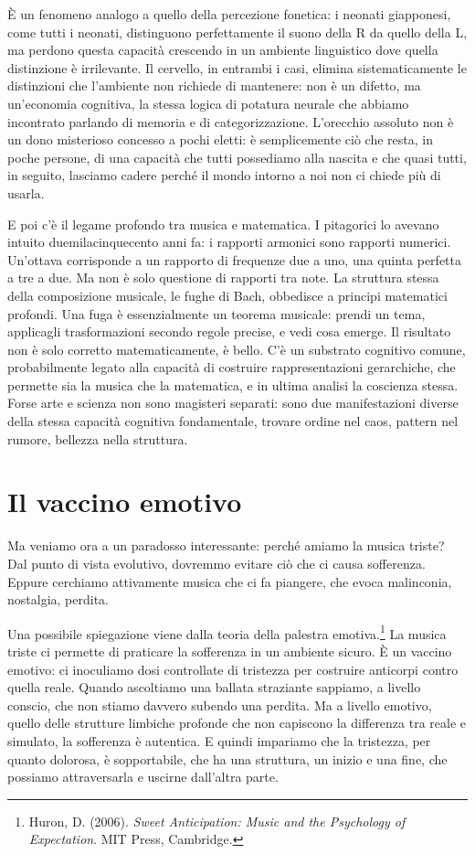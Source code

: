 \`{E} un fenomeno analogo a quello della percezione fonetica: i neonati giapponesi, come tutti i neonati, distinguono perfettamente il suono della R da quello della L, ma perdono questa capacit\`{a} crescendo in un ambiente linguistico dove quella distinzione \`{e} irrilevante. Il cervello, in entrambi i casi, elimina sistematicamente le distinzioni che l'ambiente non richiede di mantenere: non \`{e} un difetto, ma un'economia cognitiva, la stessa logica di potatura neurale che abbiamo incontrato parlando di memoria e di categorizzazione. L'orecchio assoluto non \`{e} un dono misterioso concesso a pochi eletti: \`{e} semplicemente ci\`{o} che resta, in poche persone, di una capacit\`{a} che tutti possediamo alla nascita e che quasi tutti, in seguito, lasciamo cadere perch\'{e} il mondo intorno a noi non ci chiede pi\`{u} di usarla.

E poi c'\`{e} il legame profondo tra musica e matematica. I pitagorici lo avevano intuito duemilacinquecento anni fa: i rapporti armonici sono rapporti numerici. Un'ottava corrisponde a un rapporto di frequenze due a uno, una quinta perfetta a tre a due. Ma non \`{e} solo questione di rapporti tra note. La struttura stessa della composizione musicale, le fughe di Bach, obbedisce a principi matematici profondi. Una fuga \`{e} essenzialmente un teorema musicale: prendi un tema, applicagli trasformazioni secondo regole precise, e vedi cosa emerge. Il risultato non \`{e} solo corretto matematicamente, \`{e} bello. C'\`{e} un substrato cognitivo comune, probabilmente legato alla capacit\`{a} di costruire rappresentazioni gerarchiche, che permette sia la musica che la matematica, e in ultima analisi la coscienza stessa. Forse arte e scienza non sono magisteri separati: sono due manifestazioni diverse della stessa capacit\`{a} cognitiva fondamentale, trovare ordine nel caos, pattern nel rumore, bellezza nella struttura.

\section{Il vaccino emotivo}

Ma veniamo ora a un paradosso interessante: perch\'{e} amiamo la musica triste? Dal punto di vista evolutivo, dovremmo evitare ci\`{o} che ci causa sofferenza. Eppure cerchiamo attivamente musica che ci fa piangere, che evoca malinconia, nostalgia, perdita.

Una possibile spiegazione viene dalla teoria della palestra emotiva.\footnote{Huron, D. (2006). \textit{Sweet Anticipation: Music and the Psychology of Expectation}. MIT Press, Cambridge.} La musica triste ci permette di praticare la sofferenza in un ambiente sicuro. \`{E} un vaccino emotivo: ci inoculiamo dosi controllate di tristezza per costruire anticorpi contro quella reale. Quando ascoltiamo una ballata straziante sappiamo, a livello conscio, che non stiamo davvero subendo una perdita. Ma a livello emotivo, quello delle strutture limbiche profonde che non capiscono la differenza tra reale e simulato, la sofferenza \`{e} autentica. E quindi impariamo che la tristezza, per quanto dolorosa, \`{e} sopportabile, che ha una struttura, un inizio e una fine, che possiamo attraversarla e uscirne dall'altra parte.

